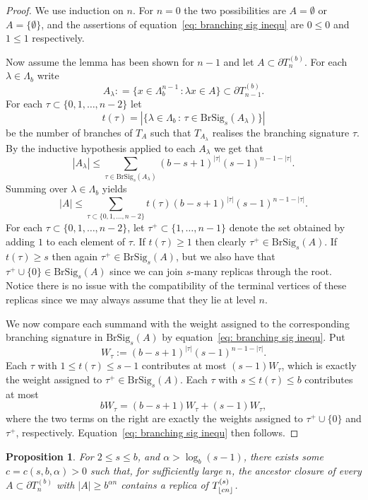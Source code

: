 \documentclass[11pt]{amsart}
\DeclarePairedDelimiter\floor{\lfloor}{\rfloor}
\newcommand\labs[1]{\left\lvert#1\right\rvert}
\renewcommand{\leq}{\leqslant}
\renewcommand{\geq}{\geqslant}
\theoremstyle{plain}
\newtheorem{pro}[thm]{Proposition}
\theoremstyle{definition}
\theoremstyle{remark}
\begin{document}
\begin{proof}
We use induction on $n$. For $n=0$ the two possibilities are $A=\emptyset$ or $A=\{\emptyset\}$, and the assertions of equation~\eqref{eq: branching sig inequ} are $0 \leq 0$ and $1\leq 1$ respectively.

Now assume the lemma has been shown for $n-1$ and let $A\subset \partial T_n^{(b)}$. For each $\lambda \in \Lambda_b$ write
\[ A_\lambda: = \{ x\in \Lambda_b^{n-1} \, : \lambda x \in A\} \subset \partial T_{n-1}^{(b)}.\]
For each $\tau \subset \{0,1,\ldots,n-2\}$ let
\[ t(\tau)= \labs{\{ \lambda \in \Lambda_b \, : \, \tau \in \mathrm{BrSig}_s(A_\lambda)\}}\]
be the number of branches of $T_A$ such that $T_{A_\lambda}$ realises the branching signature $\tau$. By the inductive hypothesis applied to each $A_\lambda$ we get that
\[ \labs{A_\lambda} \leq \sum_{\tau \in \mathrm{BrSig}_s(A_\lambda)} (b-s+1)^{\labs{\tau}} (s-1)^{n-1-\labs{\tau}}.\]
Summing over $\lambda \in \Lambda_b$ yields
\[ \labs{A} \leq \sum_{\tau\subset \{0,1,\ldots,n-2\}} t(\tau) (b-s+1)^{\labs{\tau}} (s-1)^{n-1-\labs{\tau}}.\] 
For each $\tau \subset \{0,1,\ldots,n-2\}$, let $\tau^+ \subset \{1,\ldots,n-1\}$ denote the set obtained by adding $1$ to each element of $\tau$. If $t(\tau)\geq 1$ then clearly $\tau^+ \in \mathrm{BrSig}_s(A)$. If $t(\tau)\geq s$ then again $\tau^+\in\mathrm{BrSig}_s(A)$, but we also have that $\tau^+\cup\{0\} \in \mathrm{BrSig}_s(A)$ since we can join $s$-many replicas through the root. Notice there is no issue with the compatibility of the terminal vertices of these replicas since we may always assume that they lie at level $n$.

We now compare each summand with the weight assigned to the corresponding branching signature in $\mathrm{BrSig}_s(A)$ by equation~\eqref{eq: branching sig inequ}. Put
\[W_\tau:=(b-s+1)^{\labs{\tau}}(s-1)^{n-1-\labs{\tau}}.\]
Each $\tau$ with $1 \leq t(\tau) \leq s-1$ contributes at most $(s-1)W_\tau$, which is exactly the weight assigned to $\tau^+ \in \mathrm{BrSig}_s(A)$. Each $\tau$ with $s\leq t(\tau) \leq b$ contributes at most
\[bW_\tau=(b-s+1)W_\tau+(s-1)W_\tau,\]
where the two terms on the right are exactly the weights assigned to $\tau^+\cup \{0\}$ and $\tau^+$, respectively. Equation~\eqref{eq: branching sig inequ} then follows.
\end{proof}
\begin{pro}\label{Prop: Linear length 1d replicas}
For $2\leq s \leq b$, and $\alpha > \log_b(s-1)$, there exists some $c=c(s,b,\alpha)>0$ such that, for sufficiently large $n$, the ancestor closure of every $A\subset \partial T_n^{(b)}$ with $\labs{A} \geq b^{\alpha n}$ contains a replica of $T_{\floor{cn}}^{(s)}$.
\end{pro}
\end{document}
